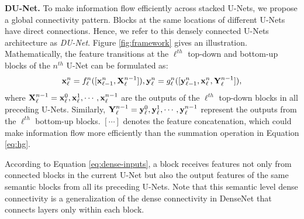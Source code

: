 {\bf DU-Net.} To make information flow efficiently across stacked U-Nets, we propose a global connectivity pattern. Blocks at the same locations of different U-Nets have direct connections. Hence, we refer to this densely connected U-Nets architecture as {\it DU-Net}. Figure \ref{fig:framework} gives an illustration. Mathematically, the feature transitions at the $\ell^{th}$ top-down and bottom-up blocks of the $n^{th}$ U-Net can be formulated as:
\begin{equation}\label{eq:dense-inputs}
    {\bf x}_\ell^n = f_\ell^n([{\bf x}_{\ell-1}^n, {\bf X}_\ell^{n-1}]), {\bf y}_\ell^n = g_\ell^n([{\bf y}_{\ell-1}^n,{\bf x}_\ell^n,{\bf Y}_\ell^{n-1}]),
\end{equation}
where ${\bf X}_\ell^{n-1}={\bf x}_\ell^0,{\bf x}_\ell^1,\cdots,{\bf x}_\ell^{n-1}$ are the outputs of the $\ell^{th}$ top-down blocks in all preceding U-Nets. Similarly, ${\bf Y}_\ell^{n-1}={\bf y}_\ell^0,{\bf y}_\ell^1,\cdots,{\bf y}_\ell^{n-1}$ represent the outputs from the $\ell^{th}$ bottom-up blocks. $[\cdots]$ denotes the feature concatenation, which could make information flow more efficiently than the summation operation in Equation \ref{eq:hg}. 

According to Equation \ref{eq:dense-inputs}, a block receives features not only from connected blocks in the current U-Net but also the output features of the same semantic blocks from all its preceding U-Nets. Note that this semantic level dense connectivity is a generalization of the dense connectivity in DenseNet \cite{huang2016densely} that connects layers only within each block.

